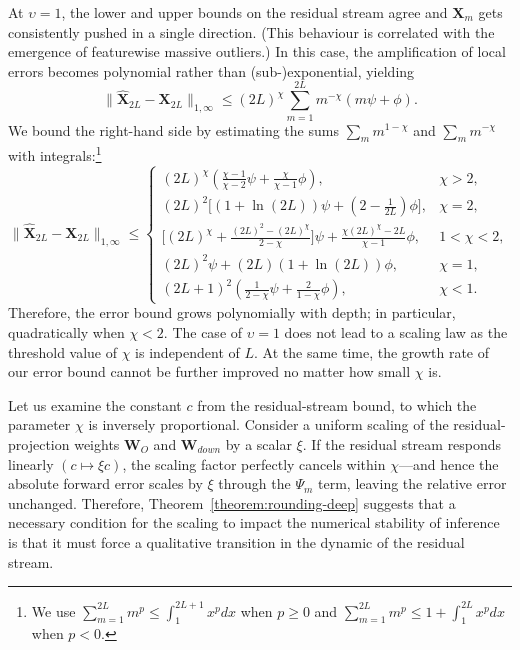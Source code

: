\documentclass[namedate,webpdf,imanum]{ima-authoring-template}
\newcommand{\Matrix}[1]{\mathbf{#1}}
\newcommand{\Norm}[3][]{#1\| #2 #1\|_{\mathrm{#3}}}
\numberwithin{equation}{section}
\begin{document}
At $\upsilon = 1$, the lower and upper bounds on the residual stream agree and $\Matrix{X}_m$ gets consistently pushed in a single direction.
(This behaviour is correlated with the emergence of featurewise massive outliers.)
In this case, the amplification of local errors becomes polynomial rather than (sub-)exponential, yielding
\begin{equation*}
    \Norm{\Matrix{\hat{X}}_{2L} - \Matrix{X}_{2L}}{1, \infty} \leq (2L)^\chi \sum_{m = 1}^{2L} m^{-\chi} (m \psi + \phi).
\end{equation*}
We bound the right-hand side by estimating the sums $\sum_m m^{1 - \chi}$ and $\sum_m m^{-\chi}$ with integrals:\footnote{We use $\sum_{m = 1}^{2L} m^p \leq \int_{1}^{2L+1} x^p dx$ when $p \geq 0$ and $\sum_{m = 1}^{2L} m^p \leq 1 + \int_{1}^{2L} x^p dx$ when $p < 0$.}
\begin{equation*}
    \Norm{\Matrix{\hat{X}}_{2L} - \Matrix{X}_{2L}}{1, \infty} \leq \begin{cases}
        (2L)^\chi (\frac{\chi - 1}{\chi - 2} \psi + \frac{\chi}{\chi - 1} \phi), & \chi > 2, \\
        (2L)^2 \big[(1 + \ln(2L)) \psi + (2 - \frac{1}{2L}) \phi\big], & \chi = 2, \\
        \big[(2L)^\chi + \frac{(2L)^2 - (2L)^\chi}{2 - \chi}\big] \psi + \frac{\chi (2L)^{\chi} - 2L}{\chi - 1} \phi, & 1 < \chi < 2, \\
        (2L)^2 \psi + (2L) (1 + \ln(2L)) \phi, & \chi = 1, \\
        (2L + 1)^2 (\frac{1}{2 - \chi} \psi + \frac{2}{1 - \chi} \phi), & \chi < 1.
    \end{cases}
\end{equation*}
Therefore, the error bound grows polynomially with depth; in particular, quadratically when $\chi < 2$.
The case of $\upsilon = 1$ does not lead to a scaling law as the threshold value of $\chi$ is independent of $L$.
At the same time, the growth rate of our error bound cannot be further improved no matter how small $\chi$ is.

Let us examine the constant $c$ from the residual-stream bound, to which the parameter $\chi$ is inversely proportional.
Consider a uniform scaling of the residual-projection weights $\Matrix{W}_O$ and $\Matrix{W}_{down}$ by a scalar $\xi$.
If the residual stream responds linearly $(c \mapsto \xi c)$, the scaling factor perfectly cancels within $\chi$---and hence the absolute forward error scales by $\xi$ through the $\Psi_m$ term, leaving the relative error unchanged.
Therefore, Theorem~\ref{theorem:rounding-deep} suggests that a necessary condition for the scaling to impact the numerical stability of inference is that it must force a qualitative transition in the dynamic of the residual stream.
\end{document}

